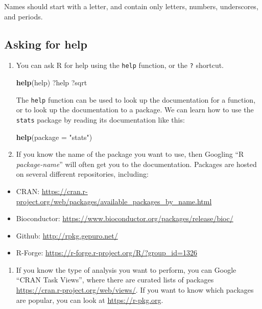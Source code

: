 \documentclass[]{book}
\newenvironment{Shaded}{\begin{snugshade}}{\end{snugshade}}
\newcommand{\KeywordTok}[1]{\textcolor[rgb]{0.13,0.29,0.53}{\textbf{#1}}}
\newcommand{\DataTypeTok}[1]{\textcolor[rgb]{0.13,0.29,0.53}{#1}}
\newcommand{\StringTok}[1]{\textcolor[rgb]{0.31,0.60,0.02}{#1}}
\newcommand{\NormalTok}[1]{#1}
\providecommand{\tightlist}{%
  \setlength{\itemsep}{0pt}\setlength{\parskip}{0pt}}
\begin{document}
Names should start with a letter, and contain only letters, numbers,
underscores, and periods.

\subsection{Asking for help}\label{asking-for-help}

\begin{enumerate}
\def\labelenumi{\arabic{enumi}.}
\item
  You can ask R for help using the \texttt{help} function, or the
  \texttt{?} shortcut.

\begin{Shaded}
\begin{Highlighting}[]
\KeywordTok{help}\NormalTok{(help)}
\NormalTok{?help}
\NormalTok{?sqrt}
\end{Highlighting}
\end{Shaded}

  The \texttt{help} function can be used to look up the documentation
  for a function, or to look up the documentation to a package. We can
  learn how to use the \texttt{stats} package by reading its
  documentation like this:

\begin{Shaded}
\begin{Highlighting}[]
   \KeywordTok{help}\NormalTok{(}\DataTypeTok{package =} \StringTok{"stats"}\NormalTok{)}
\end{Highlighting}
\end{Shaded}
\item
  If you know the name of the package you want to use, then Googling ``R
  \emph{package-name}'' will often get you to the documentation.
  Packages are hosted on several different repositories, including:
\end{enumerate}

\begin{itemize}
\tightlist
\item
  CRAN:
  \url{https://cran.r-project.org/web/packages/available_packages_by_name.html}
\item
  Bioconductor:
  \url{https://www.bioconductor.org/packages/release/bioc/}
\item
  Github: \url{http://rpkg.gepuro.net/}
\item
  R-Forge: \url{https://r-forge.r-project.org/R/?group_id=1326}
\end{itemize}

\begin{enumerate}
\def\labelenumi{\arabic{enumi}.}
\setcounter{enumi}{2}
\tightlist
\item
  If you know the type of analysis you want to perform, you can Google
  ``CRAN Task Views'', where there are curated lists of packages
  \url{https://cran.r-project.org/web/views/}. If you want to know which
  packages are popular, you can look at \url{https://r-pkg.org}.
\end{enumerate}
\end{document}
